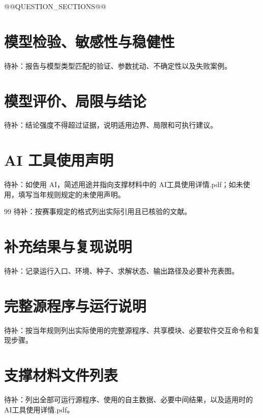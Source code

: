\documentclass[UTF8,zihao=-4]{ctexart}
\begin{document}
@@QUESTION_SECTIONS@@

\section{模型检验、敏感性与稳健性}

待补：报告与模型类型匹配的验证、参数扰动、不确定性以及失败案例。

\section{模型评价、局限与结论}

待补：结论强度不得超过证据，说明适用边界、局限和可执行建议。

\section*{AI 工具使用声明}

待补：如使用 AI，简述用途并指向支撑材料中的 AI工具使用详情.pdf；如未使用，填写当年规则规定的未使用声明。

\begin{thebibliography}{99}
待补：按赛事规定的格式列出实际引用且已核验的文献。
\end{thebibliography}

\appendix
\section{补充结果与复现说明}

待补：记录运行入口、环境、种子、求解状态、输出路径及必要补充表图。

\section{完整源程序与运行说明}

待补：按当年规则列出实际使用的完整源程序、共享模块、必要软件交互命令和复现步骤。

\section{支撑材料文件列表}

待补：列出全部可运行源程序、使用的自主数据、必要中间结果，以及适用时的 AI工具使用详情.pdf。
\end{document}
